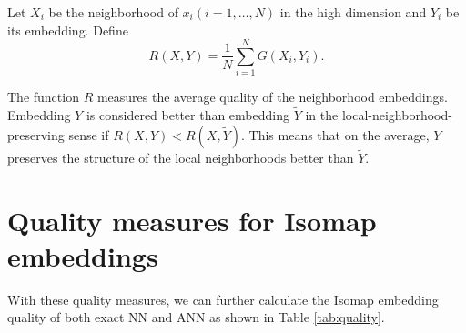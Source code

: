 \documentclass[11pt,a4paper,]{article}
\newenvironment{Shaded}{\begin{snugshade}}{\end{snugshade}}
\newcommand{\CommentTok}[1]{\textcolor[rgb]{0.56,0.35,0.01}{\textit{#1}}}
\newcommand{\DataTypeTok}[1]{\textcolor[rgb]{0.13,0.29,0.53}{#1}}
\newcommand{\DecValTok}[1]{\textcolor[rgb]{0.00,0.00,0.81}{#1}}
\newcommand{\KeywordTok}[1]{\textcolor[rgb]{0.13,0.29,0.53}{\textbf{#1}}}
\newcommand{\NormalTok}[1]{#1}
\newcommand{\OperatorTok}[1]{\textcolor[rgb]{0.81,0.36,0.00}{\textbf{#1}}}
\newcommand{\OtherTok}[1]{\textcolor[rgb]{0.56,0.35,0.01}{#1}}
\newcommand{\StringTok}[1]{\textcolor[rgb]{0.31,0.60,0.02}{#1}}
\begin{document}
Let \(X_{i}\) be the neighborhood of \(x_{i}(i=1, \ldots, N)\) in the high dimension and \(Y_{i}\) be its embedding. Define
\[
R(X, Y)=\frac{1}{N} \sum_{i=1}^{N} G \left(X_{i}, Y_{i}\right).
\]

The function \(R\) measures the average quality of the neighborhood embeddings. Embedding \(Y\) is considered better than embedding \(\tilde{Y}\) in the local-neighborhood-preserving sense if \(R(X, Y) < R(X, \tilde{Y})\). This means that on the average, \(Y\) preserves the structure of the local neighborhoods better than \(\tilde{Y}\).

\hypertarget{quality-measures-for-isomap-embeddings}{%
\section{Quality measures for Isomap embeddings}\label{quality-measures-for-isomap-embeddings}}

With these quality measures, we can further calculate the Isomap embedding quality of both exact NN and ANN as shown in Table \ref{tab:quality}.

\begin{Shaded}
\end{Shaded}
\end{document}
